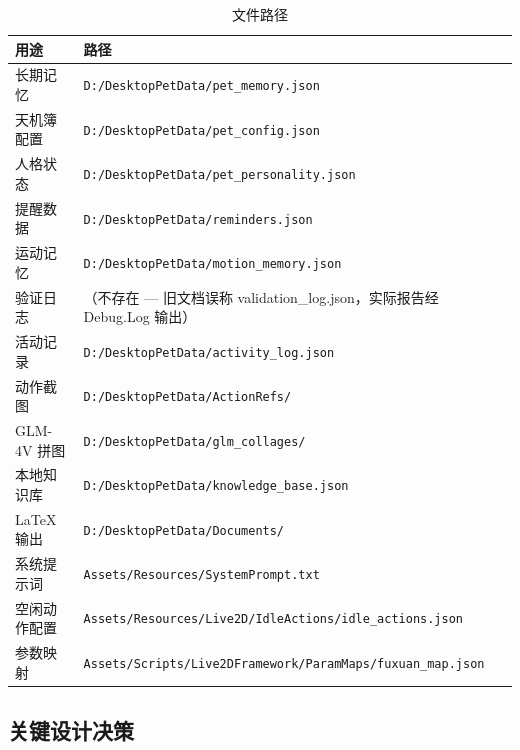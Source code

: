 \documentclass[12pt,a4paper]{ctexart}
\begin{document}
\begin{table}[H]
\centering
\caption{文件路径}
\label{tab:paths}
\begin{tabular}{ll}
\toprule
\textbf{用途} & \textbf{路径} \\
\midrule
长期记忆 & \texttt{D:/DesktopPetData/pet\_memory.json} \\
天机簿配置 & \texttt{D:/DesktopPetData/pet\_config.json} \\
人格状态 & \texttt{D:/DesktopPetData/pet\_personality.json} \\
提醒数据 & \texttt{D:/DesktopPetData/reminders.json} \\
运动记忆 & \texttt{D:/DesktopPetData/motion\_memory.json} \\
验证日志 & （不存在 --- 旧文档误称 validation\_log.json，实际报告经 Debug.Log 输出） \\
活动记录 & \texttt{D:/DesktopPetData/activity\_log.json} \\
动作截图 & \texttt{D:/DesktopPetData/ActionRefs/} \\
GLM-4V 拼图 & \texttt{D:/DesktopPetData/glm\_collages/} \\
本地知识库 & \texttt{D:/DesktopPetData/knowledge\_base.json} \\
LaTeX 输出 & \texttt{D:/DesktopPetData/Documents/} \\
系统提示词 & \texttt{Assets/Resources/SystemPrompt.txt} \\
空闲动作配置 & \texttt{Assets/Resources/Live2D/IdleActions/idle\_actions.json} \\
参数映射 & \texttt{Assets/Scripts/Live2DFramework/ParamMaps/fuxuan\_map.json} \\
\bottomrule
\end{tabular}
\end{table}

\subsection{关键设计决策}
\end{document}

